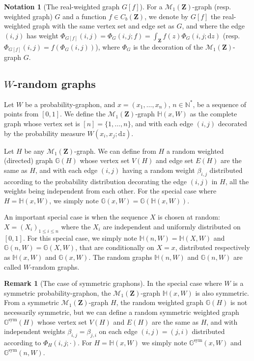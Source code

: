 \documentclass{amsart}
\theoremstyle{plain}
\theoremstyle{definition}
\newtheorem{remark}[Th]{Remark}
\newtheorem{notation}[Th]{Notation}
\newcommand{\Space}{\mathbf{Z}}
\newcommand{\Proba}{\mathcal{M}_1(\Space)}
\newcommand{\CbFunct}{C_b(\Space)}
\newcommand{\N}{\mathbb{N}}
\newcommand{\drv}{\mathrm{d}}
\begin{document}
\begin{notation}[{The real-weighted graph $G[f]$}]
	\label{notation_graphe_function}
For a $\Proba$-graph (resp. weighted graph) $G$ 
and a function $f\in\CbFunct$,
we denote by $G[f]$ the real-weighted graph with the same
vertex set and edge set as $G$, 
and where the edge $(i,j)$ has weight 
$\Phi_{G[f]}(i,j)=\Phi _G(i,j;f) = \int_{\Space} f(z)\Phi_G(i,j;\drv z)$
(resp. $\Phi_{G[f]}(i,j)= f( \Phi_G(i,j) )$), where $\Phi_G$ is the decoration of the 
$\Proba$-graph  $G$.
\end{notation}

\subsection{\texorpdfstring{$W$}{}-random graphs}
	\label{subsection_W_random_graphs}

Let $W$ be a probability-graphon, and $x=(x_1,\dots,x_n)$, $n\in\N^*$,
	be a sequence of points from $[0,1]$.
We define the $\Proba$-graph $\mathbb{H}(x,W)$
as the complete graph whose vertex set is $[n] = \{1,\dots,n\}$,
and with each edge $(i,j)$ decorated by the probability measure 
$W(x_i,x_j;\drv z)$.

Let $H$ be any $\Proba$-graph.
We can define from $H$ a random weighted (directed) graph $\mathbb{G}(H)$
whose vertex set $V(H)$ and edge set $E(H)$ are the same as $H$,
and with each edge $(i,j)$ having a random weight $\beta_{i,j}$ 
distributed according to 
the probability distribution  decorating the edge $(i,j)$ in $H$,
all the weights being independent from each other.
For the special case where $H = \mathbb{H}(x,W)$,
we simply note  $\mathbb{G}(x,W) = \mathbb{G}(\mathbb{H}(x,W))$.

An important special case is when the sequence $X$ is chosen at random:
$X=(X_i)_{1\leq i\leq n}$ where the $X_i$ are independent 
and uniformly distributed on $[0,1]$.
For this special case, we simply note
$\mathbb{H}(n,W) =\mathbb{H}(X,W)$
and $\mathbb{G}(n,W) =\mathbb{G}(X,W)$,
that are conditionally on $X=x$,  distributed respectively as
$\mathbb{H}(x,W)$ and  $\mathbb{G}(x,W)$.
The random graphs $\mathbb{H}(n,W)$ and $\mathbb{G}(n,W)$
	are called $W$-random graphs.

\begin{remark}[The case of symmetric graphons]
In the special case where $W$ is a symmetric probability-graphon,
the $\Proba$-graph $\mathbb{H}(x,W)$ is also symmetric.
From a symmetric $\Proba$-graph $H$,
the random weighted graph $\mathbb{G}(H)$ is not necessarily symmetric,
but we can define a random symmetric weighted graph 
$\mathbb{G}^{\text{sym}}(H)$
whose vertex set $V(H)$ and $E(H)$ are the same as $H$,
and with independent weights $\beta_{i,j} = \beta_{j,i}$ on each edge $(i,j)=(j,i)$
distributed according to $\Phi_H(i,j;\cdot)$.
For $H = \mathbb{H}(x,W)$ we simply note $\mathbb{G}^{\text{sym}}(x,W)$
and $\mathbb{G}^{\text{sym}}(n,W)$.
\end{remark}
\end{document}

